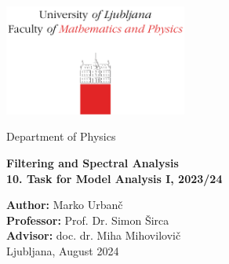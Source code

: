 \documentclass[10pt, titlepage, a4paper]{article}
\begin{document}
\begin{titlepage}
{\centering
\includegraphics[width=6cm]{logo_fmf.pdf}

\vspace{0.8cm}
{\small Department of Physics}

\vspace{5cm}
\vspace{0.5cm}
{\huge\textbf{Filtering and Spectral Analysis}} \\
\vspace{0.5cm}
{\large\textbf{10. Task for Model Analysis I, 2023/24}}

\vfill
\textbf{Author:} Marko Urbanč \\
\textbf{Professor:}  Prof. Dr. Simon Širca \\
\textbf{Advisor:}  doc. dr. Miha Mihovilovič\\

\vspace{1cm}
Ljubljana, August 2024 \\
}
\vspace{3cm}
\end{titlepage}

\hypersetup{pageanchor=true}
\setcounter{page}{2}
\tableofcontents
\vspace{1cm}


\end{document}
